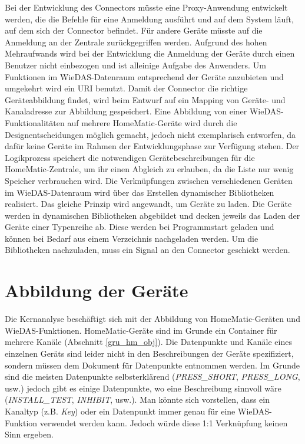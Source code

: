 Bei der Entwicklung des Connectors müsste eine Proxy-Anwendung entwickelt werden, die die
Befehle für eine Anmeldung ausführt und auf dem System läuft, auf dem sich der Connector befindet.
Für andere Geräte müsste auf die Anmeldung an der Zentrale zurückgegriffen werden.
Aufgrund des hohen Mehraufwands wird bei der Entwicklung die Anmeldung der Geräte durch einen
Benutzer nicht einbezogen und ist alleinige Aufgabe des Anwenders.
Um Funktionen im WieDAS-Datenraum entsprechend der Geräte anzubieten und umgekehrt wird ein URI benutzt.
Damit der Connector die richtige Geräteabbildung findet, wird beim Entwurf auf ein Mapping
von Geräte- und Kanaladresse zur Abbildung gespeichert.
Eine Abbildung von einer WieDAS-Funktionalitäten auf mehrere HomeMatic-Geräte wird durch die
Designentscheidungen möglich gemacht, jedoch nicht exemplarisch entworfen, da dafür keine
Geräte im Rahmen der Entwicklungsphase zur Verfügung stehen.
Der Logikprozess speichert die notwendigen Gerätebeschreibungen für die HomeMatic-Zentrale, um
ihr einen Abgleich zu erlauben, da die Liste nur wenig Speicher verbrauchen wird.
Die Verknüpfungen zwischen verschiedenen Geräten im WieDAS-Datenraum wird über das Erstellen
dynamischer Bibliotheken realisiert.
Das gleiche Prinzip wird angewandt, um Geräte zu laden.
Die Geräte werden in dynamischen Bibliotheken abgebildet und decken jeweils das Laden der Geräte
einer Typenreihe ab.
Diese werden bei Programmstart geladen und können bei Bedarf aus einem Verzeichnis nachgeladen werden.
Um die Bibliotheken nachzuladen, muss ein Signal an den Connector geschickt werden.

\section{Abbildung der Geräte}
\label{ana_abbildung}
Die Kernanalyse beschäftigt sich mit der Abbildung von HomeMatic-Geräten und WieDAS-Funktionen.
HomeMatic-Geräte sind im Grunde ein Container für mehrere Kanäle (Abschnitt \ref{gru_hm_obj}).
Die Datenpunkte und Kanäle eines einzelnen Geräts sind leider nicht in den Beschreibungen
der Geräte spezifiziert, sondern müssen dem Dokument für Datenpunkte \cite{hmscript4} entnommen werden.
Im Grunde sind die meisten Datenpunkte selbsterklärend (\emph{PRESS\_SHORT}, \emph{PRESS\_LONG}, usw.)
jedoch gibt es einige Datenpunkte, wo eine Beschreibung sinnvoll wäre (\emph{INSTALL\_TEST}, \emph{INHIBIT}, usw.).
Man könnte sich vorstellen, dass ein Kanaltyp (z.B. \emph{Key}) oder ein Datenpunkt immer genau für eine
WieDAS-Funktion verwendet werden kann.
Jedoch würde diese 1:1 Verknüpfung keinen Sinn ergeben.

